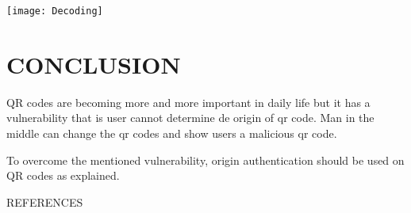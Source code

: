 \documentclass[12pt,journal,compsoc]{IEEEtran}
\begin{document}
\begin{center}
\texttt{[image: Decoding]}
\end{center}


\section{CONCLUSION}

QR codes are becoming more and more important in daily life but it has a vulnerability that is user cannot determine de origin of qr code. Man in the middle can change the qr codes and show users a malicious qr code.

To overcome the mentioned vulnerability, origin authentication should be used on QR codes as explained.

\begin{thebibliography}{1}

REFERENCES

\end{thebibliography}
\end{document}
